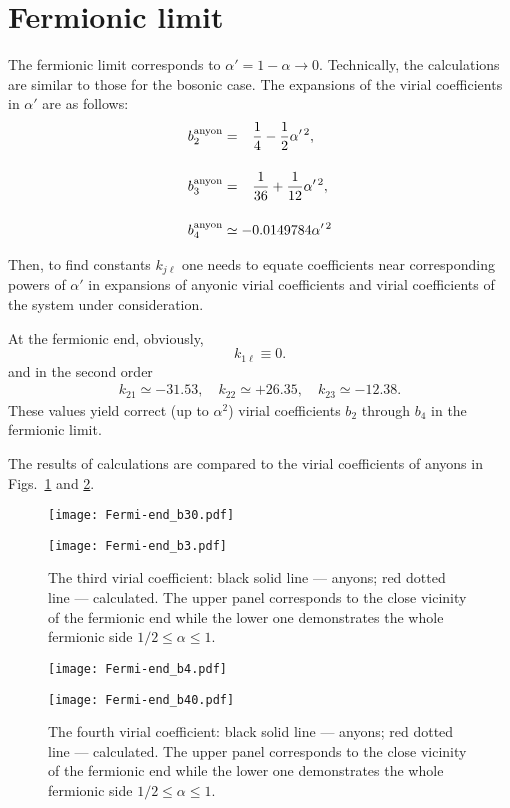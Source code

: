 \documentclass[12pt,a4paper]{article}
\begin{document}
{\section{Fermionic limit}\label{sec:fermionic}
The fermionic limit corresponds to $\alpha'=1-\alpha\to 0$. Technically, the calculations are similar to those for the bosonic case. The expansions of the virial coefficients in $\alpha'$ are as follows:
\begin{align}
&b_2^{\rm anyon} = \phantom{-}\frac14 -\frac12 \alpha'^{\,2},\\[12pt]
&b_3^{\rm anyon} = \phantom{-}
\frac{1}{36} + \frac{1}{12} \alpha'^{\,2},\\[12pt]
&b_4^{\rm anyon} \simeq -0.0149784 \alpha'^{\,2}
\end{align}

Then, to find constants $k_{j\ell}$ one needs to equate coefficients near corresponding powers of $\alpha'$ in expansions of anyonic virial coefficients and virial coefficients of the system under consideration.

At the fermionic end, obviously, 
\begin{equation}
k_{1\ell} \equiv 0.
\end{equation}
and in the second order
\begin{align}
k_{21} \simeq -31.53, \quad
k_{22} \simeq +26.35, \quad
k_{23} \simeq -12.38.
\end{align}
These values yield correct (up to $\alpha^2$) virial coefficients $b_2$ through $b_4$ in the fermionic limit.

The results of calculations are compared to the virial coefficients of anyons in Figs.~\ref{fig:b3Fermi} and \ref{fig:b4Fermi}.

\begin{figure}[h]
\centerline{\texttt{[image: Fermi-end\_b30.pdf]}}
\centerline{\texttt{[image: Fermi-end\_b3.pdf]}}
\caption{The third virial coefficient:
black solid line --- anyons;
red dotted line --- calculated.
The upper panel corresponds to the close vicinity of the fermionic end while the lower one demonstrates the whole fermionic side $1/2\leq\alpha\leq1$.
}\label{fig:b3Fermi}
\end{figure}


\begin{figure}[h]
\centerline{\texttt{[image: Fermi-end\_b4.pdf]}}
\centerline{\texttt{[image: Fermi-end\_b40.pdf]}}
\caption{The fourth virial coefficient:
black solid line --- anyons;
red dotted line --- calculated.
The upper panel corresponds to the close vicinity of the fermionic end while the lower one demonstrates the whole fermionic side $1/2\leq\alpha\leq1$.
}\label{fig:b4Fermi}
\end{figure}
\clearpage



}
\end{document}

